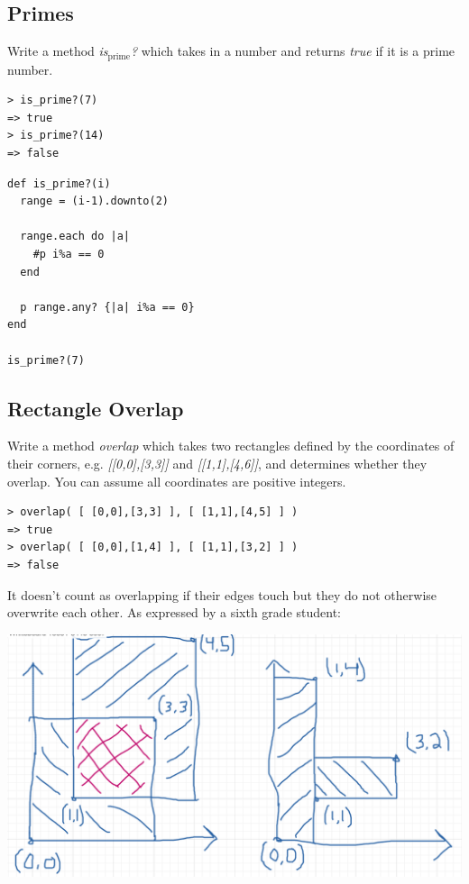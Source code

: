 \documentclass[11pt]{article}
\begin{document}
\subsection{Primes}
\label{sec-1-5}

Write a method \emph{is$_{\text{prime}}$?} which takes in a number and returns \emph{true} if it 
is a prime number.

\begin{verbatim}
> is_prime?(7)
=> true
> is_prime?(14)
=> false
\end{verbatim}

\begin{verbatim}
def is_prime?(i)
  range = (i-1).downto(2)

  range.each do |a|
    #p i%a == 0
  end

  p range.any? {|a| i%a == 0}
end

is_prime?(7)
\end{verbatim}

\subsection{Rectangle Overlap}
\label{sec-1-6}

Write a method \emph{overlap} which takes two rectangles defined by the 
coordinates of their corners, e.g. \emph{[[0,0],[3,3]]} and \emph{[[1,1],[4,6]]},
and determines whether they overlap. You can assume all coordinates are 
positive integers.

\begin{verbatim}
> overlap( [ [0,0],[3,3] ], [ [1,1],[4,5] ] )
=> true
> overlap( [ [0,0],[1,4] ], [ [1,1],[3,2] ] )
=> false 
\end{verbatim}

It doesn't count as overlapping if their edges touch but they do not 
otherwise overwrite each other. As expressed by a sixth grade student:

\includegraphics[width=.9\linewidth]{./coordinate_overlaps.png}
\end{document}
